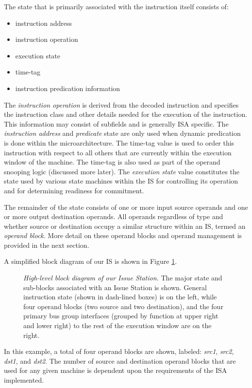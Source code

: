 \documentclass[10pt,dvips]{article}
\begin{document}
The state that is primarily associated with the instruction itself
consists of:
%
\begin{itemize}
\vspace{-0.10in}
\item{instruction address}
\vspace{-0.10in}
\item{instruction operation}
\vspace{-0.10in}
\item{execution state}
\vspace{-0.10in}
\item{time-tag}
\vspace{-0.10in}
\item{instruction predication information}
\vspace{-0.10in}
\end{itemize}   
%
The \textit{instruction operation} is derived from the decoded
instruction and specifies the instruction class and other
details needed for the execution of the instruction.
This information may consist of subfields and is generally ISA
specific.
The \textit{instruction address} and \textit{predicate} state
are only used when dynamic predication~\cite{undisclosed2}
is done within the microarchitecture.
The time-tag value is used to order this instruction
with respect to all others that are currently within the execution
window of the machine.
The time-tag is also used as part of the operand snooping
logic (discussed more later).
The \textit{execution state} value constitutes the state
used by various state machines within the IS
for controlling its operation and for determining readiness
for commitment.

The remainder of the state consists of one or more input
source operands and one or more output destination operands.
All operands regardless of type and whether source or destination
occupy a similar structure within an IS, termed an
\textit{operand block}.
More detail on these operand blocks and operand management
is provided in the next section.

A simplified block diagram of our IS is shown in 
Figure \ref{fig:issuestation}.
%
\begin{figure}
\centering
{}
\caption{{\em High-level block diagram of our Issue Station.} 
\small{
The major state and sub-blocks associated with an Issue Station is shown.
General instruction state (shown in dash-lined boxes) is
on the left, while
four operand blocks (two source and two destination),
and the four primary bus group interfaces (grouped by function at
upper right and lower right) to the rest of the
execution window are on the right.
}
}
\label{fig:issuestation}
\end{figure}
%
In this example, a total of four operand blocks are shown, labeled:
\textit{src1}, 
\textit{src2}, 
\textit{dst1}, 
and \textit{dst2}.
The number of source and destination operand blocks that are
used for any given machine is dependent upon the requirements
of the ISA implemented.
%
%
\end{document}
